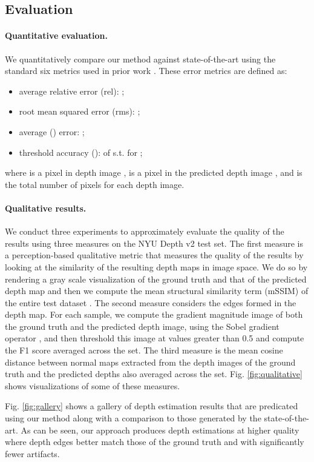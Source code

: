 \documentclass[10pt,twocolumn,letterpaper]{article}
\begin{document}
\subsection{Evaluation} 


\paragraph{Quantitative evaluation.} We quantitatively compare our method against state-of-the-art using the standard six metrics used in prior work \cite{Eigen2014}. These error metrics are defined as:
\begin{itemize}
    \item average relative error (rel): ;
    \item root mean squared error (rms): ;
    \item average () error: ;
    \item threshold accuracy ():  of  s.t.  for ;
\end{itemize}
where  is a pixel in depth image ,  is a pixel in the predicted depth image , and  is the total number of pixels for each depth image.

\paragraph{Qualitative results.} We conduct three experiments to approximately evaluate the quality of the results using three measures on the NYU Depth v2 test set. The first measure is a perception-based qualitative metric that measures the quality of the results by looking at the similarity of the resulting depth maps in image space. We do so by rendering a gray scale visualization of the ground truth and that of the predicted depth map and then we compute the mean structural similarity term (mSSIM) of the entire test dataset . The second measure considers the edges formed in the depth map. For each sample, we compute the gradient magnitude image of both the ground truth and the predicted depth image, using the Sobel gradient operator \cite{Sobel1968}, and then threshold this image at values greater than 0.5 and compute the F1 score averaged across the set. The third measure is the mean cosine distance between normal maps extracted from the depth images of the ground truth and the predicted depths also averaged across the set. Fig. \ref{fig:qualitative} shows visualizations of some of these measures.

Fig. \ref{fig:gallery} shows a gallery of depth estimation results that are predicated using our method along with a comparison to those generated by the state-of-the-art.
As can be seen, our approach produces depth estimations at higher quality where depth edges better match those of the ground truth and with significantly fewer artifacts. 
\end{document}
